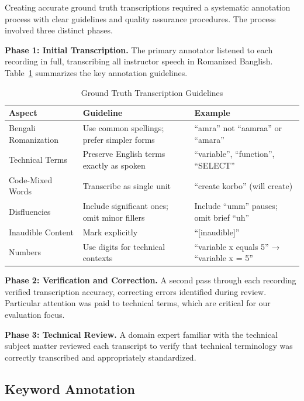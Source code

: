 Creating accurate ground truth transcriptions required a systematic annotation process with clear guidelines and quality assurance procedures. The process involved three distinct phases.

\textbf{Phase 1: Initial Transcription.} The primary annotator listened to each recording in full, transcribing all instructor speech in Romanized Banglish. Table~\ref{tab:transcription_guidelines} summarizes the key annotation guidelines.

\begin{table}[h]
\centering
\caption{Ground Truth Transcription Guidelines}
\label{tab:transcription_guidelines}
\begin{tabular}{|l|p{5cm}|p{5.5cm}|}
\hline
\textbf{Aspect} & \textbf{Guideline} & \textbf{Example} \\
\hline
Bengali Romanization & Use common spellings; prefer simpler forms & ``amra'' not ``aamraa'' or ``amara'' \\
\hline
Technical Terms & Preserve English terms exactly as spoken & ``variable'', ``function'', ``SELECT'' \\
\hline
Code-Mixed Words & Transcribe as single unit & ``create korbo'' (will create) \\
\hline
Disfluencies & Include significant ones; omit minor fillers & Include ``umm'' pauses; omit brief ``uh'' \\
\hline
Inaudible Content & Mark explicitly & ``[inaudible]'' \\
\hline
Numbers & Use digits for technical contexts & ``variable x equals 5'' → ``variable x = 5'' \\
\hline
\end{tabular}
\end{table}

\textbf{Phase 2: Verification and Correction.} A second pass through each recording verified transcription accuracy, correcting errors identified during review. Particular attention was paid to technical terms, which are critical for our evaluation focus.

\textbf{Phase 3: Technical Review.} A domain expert familiar with the technical subject matter reviewed each transcript to verify that technical terminology was correctly transcribed and appropriately standardized.

\subsection{Keyword Annotation}

